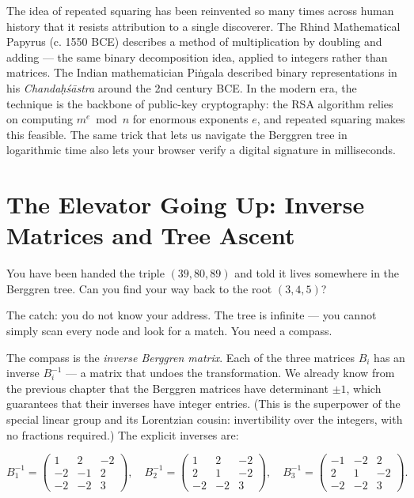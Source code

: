 \documentclass[11pt,openright,twoside]{book}
\theoremstyle{definition}
\begin{document}
The idea of repeated squaring has been reinvented so many times across human history that it resists attribution to a single discoverer. The Rhind Mathematical Papyrus (c. 1550 BCE) describes a method of multiplication by doubling and adding --- the same binary decomposition idea, applied to integers rather than matrices. The Indian mathematician Piṅgala described binary representations in his \textit{Chandaḥśāstra} around the 2nd century BCE. In the modern era, the technique is the backbone of public-key cryptography: the RSA algorithm relies on computing $m^e \bmod n$ for enormous exponents $e$, and repeated squaring makes this feasible. The same trick that lets us navigate the Berggren tree in logarithmic time also lets your browser verify a digital signature in milliseconds.


\bigskip


\section{The Elevator Going Up: Inverse Matrices and Tree Ascent}

You have been handed the triple $(39, 80, 89)$ and told it lives somewhere in the Berggren tree. Can you find your way back to the root $(3, 4, 5)$?

The catch: you do not know your address. The tree is infinite --- you cannot simply scan every node and look for a match. You need a compass.

The compass is the \textit{inverse Berggren matrix}. Each of the three matrices $B_i$ has an inverse $B_i^{-1}$ --- a matrix that undoes the transformation. We already know from the previous chapter that the Berggren matrices have determinant $\pm 1$, which guarantees that their inverses have integer entries. (This is the superpower of the special linear group and its Lorentzian cousin: invertibility over the integers, with no fractions required.) The explicit inverses are:

\[B_1^{-1} = \begin{pmatrix} 1 & 2 & -2 \\ -2 & -1 & 2 \\ -2 & -2 & 3 \end{pmatrix}, \quad B_2^{-1} = \begin{pmatrix} 1 & 2 & -2 \\ 2 & 1 & -2 \\ -2 & -2 & 3 \end{pmatrix}, \quad B_3^{-1} = \begin{pmatrix} -1 & -2 & 2 \\ 2 & 1 & -2 \\ -2 & -2 & 3 \end{pmatrix}.\]
\end{document}
